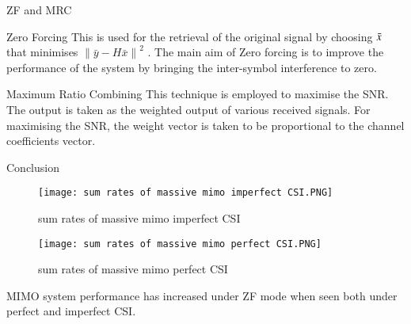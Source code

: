 \documentclass{beamer}
\newcommand\norm[1]{\left\lVert#1\right\rVert}
\begin{document}
\begin{frame}{ZF and MRC}
    \begin{block}{Zero Forcing}
     This  is  used  for  the retrieval  of  the  original  signal  by choosing $\Bar{x}$ that minimises $\norm{\bar{y}-H\bar{x}}^2$ . The main aim of Zero forcing is to  improve the performance of the system by bringing the inter-symbol interference to zero.
    \end{block}
    \begin{block}{Maximum Ratio Combining}
     This technique is employed to maximise the SNR. The output is taken as the weighted output of various received signals. For maximising the SNR, the weight vector is taken to be proportional to the channel coefficients vector.
    \end{block}
\end{frame}
\begin{frame}{Conclusion}
\begin{figure}
\centering
\begin{minipage}{.5\textwidth}
  \centering
  \texttt{[image: sum rates of massive mimo imperfect CSI.PNG]}
  \caption{sum rates of massive mimo imperfect CSI}
  \label{fig:test1}
\end{minipage}%
\begin{minipage}{.5\textwidth}
  \centering
  \texttt{[image: sum rates of massive mimo perfect CSI.PNG]}
  \caption{sum rates of massive mimo perfect CSI}
  \label{fig:test2}
\end{minipage}
\end{figure}
 MIMO  system performance  has  increased  under  ZF  mode  when  seen  both under perfect and imperfect CSI. 
\end{frame}
\end{document}
